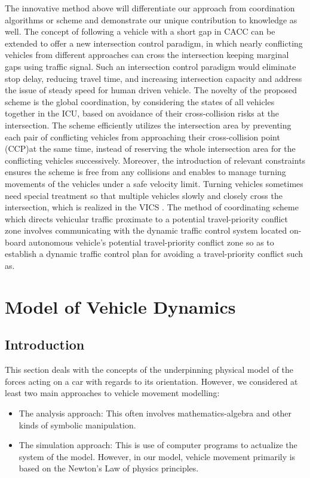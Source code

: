 \documentclass{book}
\begin{document}
The innovative method above  will differentiate our approach from  coordination algorithms or scheme and demonstrate our unique contribution to knowledge as well. The concept of following a vehicle with a short gap in CACC can be extended to offer a new intersection control paradigm, in which nearly conflicting vehicles from different approaches can cross the intersection keeping marginal gaps using traffic signal. Such an intersection control paradigm would eliminate stop delay, reducing travel time, and increasing intersection capacity and address the issue of steady speed for human driven vehicle. The novelty of the proposed scheme is the global coordination, by considering the states of all vehicles together in the ICU, based on avoidance of their cross-collision risks at the intersection. The scheme efficiently utilizes the intersection area by preventing each pair of conflicting vehicles from approaching their cross-collision point (CCP)at the same time, instead of reserving the whole intersection area for the conflicting vehicles successively. Moreover, the introduction of relevant constraints ensures the scheme is free from any collisions and enables to manage turning movements of the vehicles under a safe velocity limit. Turning vehicles sometimes need special treatment so that multiple vehicles slowly and closely cross the intersection, which is realized in the VICS \cite{kamal2015vehicle}.
The method of coordinating scheme which directs vehicular traffic proximate to a potential travel-priority conflict zone involves communicating with the dynamic traffic control system located on-board autonomous vehicle's potential travel-priority conflict zone so as to establish a dynamic traffic control plan for avoiding a travel-priority conflict such as.\\




\chapter{Model of Vehicle Dynamics}
\section{Introduction}
This section deals with the concepts of the underpinning physical model of the forces acting on a car with regards to its orientation. However, we considered at least two main approaches to vehicle movement modelling:
\begin{itemize}
    \item The analysis approach: This often involves mathematics-algebra and other kinds of symbolic manipulation.
    \item The simulation approach: This is use of computer programs to actualize the system of the model. However, in our model, vehicle movement primarily is based on the Newton’s Law of physics principles.
\end{itemize}
\end{document}
